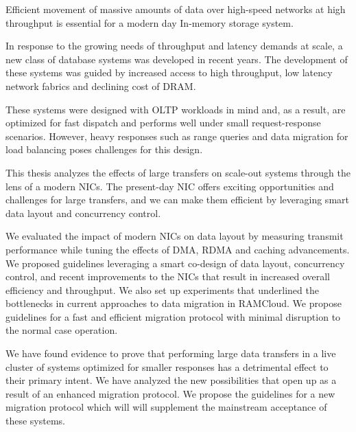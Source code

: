 

Efficient movement of massive amounts of data over high-speed networks at high 
throughput is essential for a modern day In-memory storage system.

In response to the growing needs of throughput and latency demands at scale, a new class of database systems was developed in recent years. The development of these systems was guided by increased access to high throughput, low latency network fabrics and declining cost of DRAM.

These systems were designed with OLTP workloads in mind and, as a result, are optimized for fast dispatch and performs well under small
request-response scenarios. However, heavy responses such as range queries and data migration for load balancing poses challenges for this design.  

This thesis analyzes the effects of large transfers on scale-out systems
through the lens of a modern NICs. The present-day NIC offers exciting opportunities and challenges for large transfers, and we can make them efficient by leveraging smart data layout and concurrency control.

We evaluated the impact of modern NICs on data layout by measuring transmit performance while tuning the effects of DMA, RDMA and caching advancements.
We proposed guidelines leveraging a smart co-design of data layout, concurrency control, and recent improvements to the NICs that result in increased overall efficiency and throughput. We also set up experiments that underlined the bottlenecks in current approaches to data migration in RAMCloud.
We propose guidelines for a fast and efficient migration protocol with minimal disruption to the normal case operation.

We have found evidence to prove that performing large data transfers in a live cluster of systems optimized for smaller responses has a detrimental effect to their primary intent. 
We have analyzed the new possibilities that open up as a result of an enhanced migration protocol.
We propose the guidelines for a new migration protocol which will will supplement the
mainstream acceptance of these systems.
